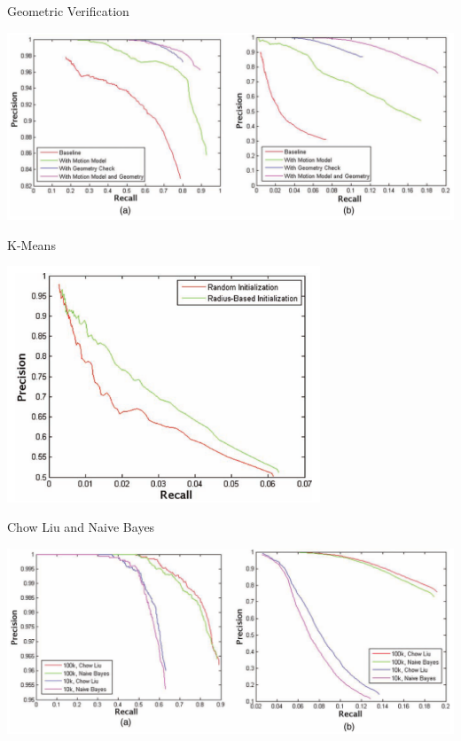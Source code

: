 \begin{frame}{Geometric Verification}
    \begin{center}
        \includegraphics[width=1.0\textwidth]{./media/results_geo_verif.png}
    \end{center}
\end{frame}

\begin{frame}{K-Means}
    \begin{center}
        \includegraphics[width=0.7\textwidth]{./media/precision_recall_kmeans.png}
    \end{center}
\end{frame}

\begin{frame}{Chow Liu and Naive Bayes}
    \begin{center}
        \includegraphics[width=1.0\textwidth]{./media/results2.png}
    \end{center}
\end{frame}

